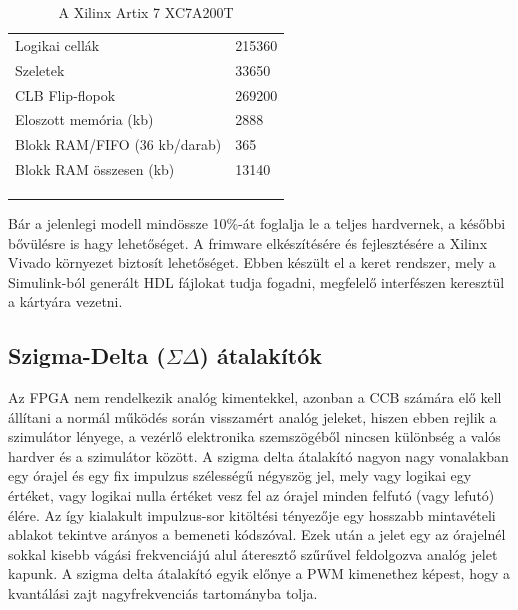 \begin{table}[]
\centering
\begin{tabular}{ll}
Logikai cellák               & 215360 \\
Szeletek                     & 33650  \\
CLB Flip-flopok              & 269200 \\
Eloszott memória (kb)        & 2888   \\
Blokk RAM/FIFO (36 kb/darab) & 365    \\
Blokk RAM összesen (kb)      & 13140  \\
                             &        \\
                             &        \\
                             & 
  
\end{tabular}
\caption{A Xilinx Artix 7 XC7A200T}
\label{artix7spec}    
\end{table}

Bár a jelenlegi modell mindössze 10\%-át foglalja le a teljes hardvernek, a későbbi bővülésre is hagy lehetőséget. A frimware elkészítésére és fejlesztésére a Xilinx Vivado környezet biztosít lehetőséget. Ebben készült el a keret rendszer, mely a Simulink-ból generált HDL fájlokat tudja fogadni, megfelelő interfészen keresztül a kártyára vezetni.


\subsection{Szigma-Delta ($\Sigma{}\Delta{}$) átalakítók}

Az FPGA nem rendelkezik analóg kimentekkel, azonban a CCB számára elő kell állítani a normál működés során visszamért analóg jeleket, hiszen ebben rejlik a szimulátor lényege, a vezérlő elektronika szemszögéből nincsen különbség a valós hardver és a szimulátor között. A szigma delta átalakító nagyon nagy vonalakban egy órajel és egy fix impulzus szélességű négyszög jel, mely vagy logikai egy értéket, vagy logikai nulla értéket vesz fel az órajel minden felfutó (vagy lefutó) élére. Az így kialakult impulzus-sor kitöltési tényezője egy hosszabb mintavételi ablakot tekintve arányos a bemeneti kódszóval. Ezek után a jelet egy az órajelnél sokkal kisebb vágási frekvenciájú alul áteresztő szűrűvel feldolgozva analóg jelet kapunk. A szigma delta átalakító egyik előnye a PWM kimenethez képest, hogy a kvantálási zajt nagyfrekvenciás tartományba tolja. \cite{artofelectronics}

